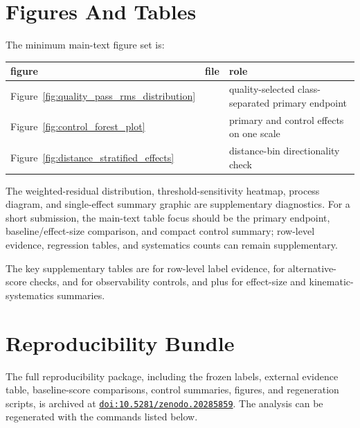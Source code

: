 \documentclass[11pt]{article}
\begin{document}
\section{Figures And Tables}
The minimum main-text figure set is:

\begin{table}[htbp]
\centering
\footnotesize
\setlength{\tabcolsep}{3pt}
\begin{tabularx}{\linewidth}{Y Y Y}
\toprule
figure & file & role \\
\midrule
Figure~\ref{fig:quality_pass_rms_distribution} &  & quality-selected class-separated primary endpoint \\
Figure~\ref{fig:control_forest_plot} &  & primary and control effects on one scale \\
Figure~\ref{fig:distance_stratified_effects} &  & distance-bin directionality check \\
\bottomrule
\end{tabularx}
\end{table}
The weighted-residual distribution, threshold-sensitivity heatmap, process diagram, and single-effect summary graphic are supplementary diagnostics. For a short submission, the main-text table focus should be the primary endpoint, baseline/effect-size comparison, and compact control summary; row-level evidence, regression tables, and systematics counts can remain supplementary.

The key supplementary tables are  for row-level label evidence,  for alternative-score checks,  and  for observability controls, and  plus  for effect-size and kinematic-systematics summaries.

\section{Reproducibility Bundle}
\label{sec:reproducibility}
The full reproducibility package, including the frozen labels, external evidence table, baseline-score comparisons, control summaries, figures, and regeneration scripts, is archived at \href{https://doi.org/10.5281/zenodo.20285859}{\nolinkurl{doi:10.5281/zenodo.20285859}}. The analysis can be regenerated with the commands listed below.
\end{document}
